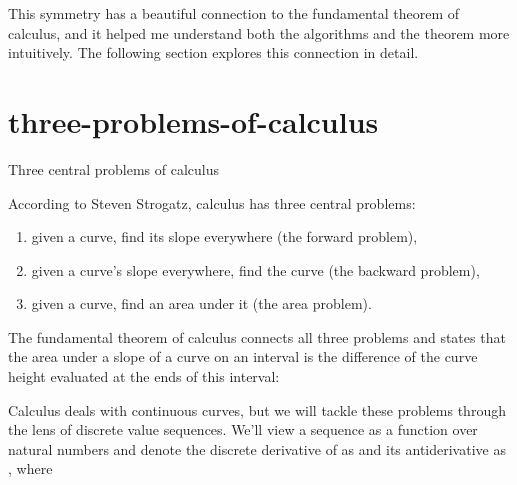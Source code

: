 \documentclass{article}
\begin{document}
This symmetry has a beautiful connection to the fundamental theorem of calculus,
and it helped me understand both the algorithms and the theorem more intuitively.
The following section explores this connection in detail.

\section{three-problems-of-calculus}{Three central problems of calculus}

According to Steven Strogatz, calculus has three central problems:
\begin{enumerate}
\item given a curve, find its slope everywhere (the forward problem),
\item given a curve’s slope everywhere, find the curve (the backward problem),
\item given a curve, find an area under it (the area problem).
\end{enumerate}

The fundamental theorem of calculus connects all three problems
and states that the area under a slope of a curve on an interval
is the difference of the curve height evaluated at the ends of this interval:


Calculus deals with continuous curves, but we will tackle these problems through the lens of discrete value sequences.
We'll view a sequence  as a function over natural numbers
and denote the discrete derivative of  as 
and its antiderivative as , where

\end{document}
